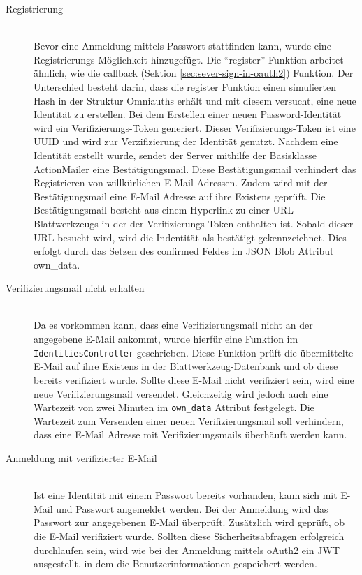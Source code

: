 \begin{description}
	\item[Registrierung]\hfill\\
	Bevor eine Anmeldung mittels Passwort stattfinden kann, wurde eine Registrierungs-Möglichkeit hinzugefügt. Die \enquote{register} Funktion arbeitet ähnlich, wie die callback (Sektion \ref{sec:sever-sign-in-oauth2}) Funktion. Der Unterschied besteht darin, dass die register Funktion einen simulierten Hash in der Struktur Omniauths erhält und mit diesem versucht, eine neue Identität zu erstellen. Bei dem Erstellen einer neuen Password-Identität wird ein Verifizierungs-Token generiert. Dieser Verifizierungs-Token ist eine \gls{UUID} und wird zur Verzifizierung der Identität genutzt. Nachdem eine Identität erstellt wurde, sendet der Server mithilfe der Basisklasse ActionMailer eine Bestätigungsmail. Diese Bestätigungsmail verhindert das Registrieren von willkürlichen E-Mail Adressen. Zudem wird  mit der Bestätigungsmail eine E-Mail Adresse auf ihre Existens geprüft. Die Bestätigungsmail besteht aus einem Hyperlink zu einer \gls{URL} Blattwerkzeugs in der der Verifizierungs-Token enthalten ist. Sobald dieser \gls{URL} besucht wird, wird die Indentität als bestätigt gekennzeichnet. Dies erfolgt durch das Setzen des confirmed Feldes im JSON Blob Attribut own\_data.

	\item[Verifizierungsmail nicht erhalten]\hfill\\
	Da es vorkommen kann, dass eine Verifizierungsmail nicht an der angegebene E-Mail ankommt, wurde hierfür eine Funktion im \texttt{IdentitiesController} geschrieben. Diese Funktion prüft die übermittelte E-Mail auf ihre Existens in der Blattwerkzeug-Datenbank und ob diese bereits verifiziert wurde. Sollte diese E-Mail nicht verifiziert sein, wird eine neue Verifizierungsmail versendet. Gleichzeitig wird jedoch auch eine Wartezeit von zwei Minuten im \texttt{own\_data} Attribut festgelegt. Die Wartezeit zum Versenden einer neuen Verifizierungsmail soll verhindern, dass eine E-Mail Adresse mit Verifizierungsmails überhäuft werden kann.

	\item[Anmeldung mit verifizierter E-Mail]\hfill\\
	Ist eine Identität mit einem Passwort bereits vorhanden, kann sich mit E-Mail und Passwort angemeldet werden. Bei der Anmeldung wird das Passwort zur angegebenen E-Mail überprüft. Zusätzlich wird geprüft, ob die E-Mail verifiziert wurde. Sollten diese Sicherheitsabfragen erfolgreich durchlaufen sein, wird wie bei der Anmeldung mittels \gls{oAuth2} ein \gls{JWT} ausgestellt, in dem die Benutzerinformationen gespeichert werden.


\end{description}

